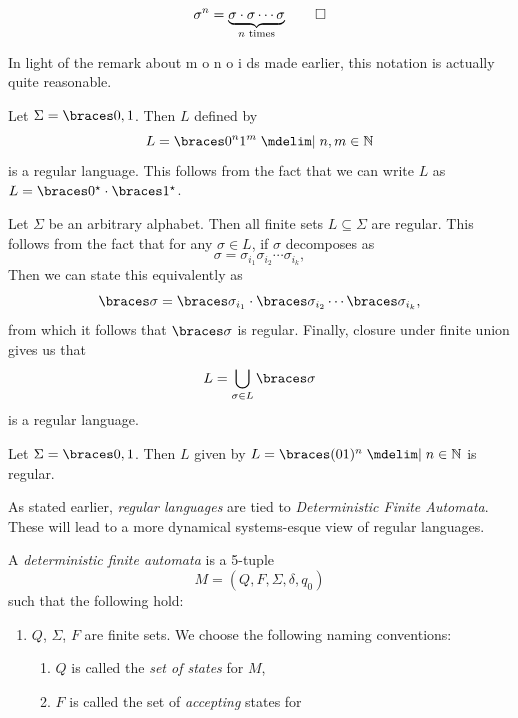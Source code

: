 \documentclass{fkpaper}
\begin{document}
\begin{multicols}{2}
\begin{definition}
\[      \sigma^n = \underbrace{\sigma \cdot \sigma \cdots \sigma}_{n\text{
          times}} \qedhere
    \]
  \end{definition}
  In light of the remark about {\color{red} m} {\color{orange} o}
  {\color{yellow} n} {\color{green} o} {\color{blue} i} {\color{purple}
    d}s made earlier, this notation is actually quite reasonable.
  \begin{example}\label{ex:dfa-example}
    Let $\Sigma = \set{0,1}$. Then $L$ defined by
    \[
      L = \set{0^n 1^m \MID n,m \in \NN}
    \]
    is a regular language. This follows from the fact that we can write
    $L$ as $L = \set{0}^\star \cdot \set{1}^\star$.
  \end{example}
  \begin{example}
    Let $\Sigma$ be an arbitrary alphabet. Then all finite sets $L
    \subseteq \Sigma$ are regular. This follows from the fact that for
    any $\sigma\in L$, if $\sigma$ decomposes as
    \[
      \sigma = \sigma_{i_1} \sigma_{i_2} \cdots \sigma_{i_k},
    \]
    Then we can state this equivalently as
    \[
      \set{\sigma} = \set{\sigma_{i_1}} \cdot \set{\sigma_{i_2}} \cdots
      \set{\sigma_{i_k}},
    \]
    from which it follows that $\set{\sigma}$ is regular. Finally,
    closure under finite union gives us that
    \[
      L = \bigcup_{\sigma \in L} \set{\sigma}
    \]
    is a regular language.
  \end{example}
  \begin{example}
    Let $\Sigma = \set{0,1}$. Then $L$ given by $L = \set{(01)^n \MID n
      \in \NN}$ is regular.
  \end{example}
  As stated earlier, \emph{regular languages} are tied to
  \emph{Deterministic Finite Automata}. These will lead to a more
  dynamical systems-esque view of regular languages.
  \begin{definition}\label{def:dfa}
    A \emph{deterministic finite automata} is a 5-tuple
    \[
      M = (Q, F, \Sigma, \delta, q_0)
    \]
    such that the following hold:
    \begin{enumerate}
      \item $Q$, $\Sigma$, $F$ are finite sets. We choose the following
        naming conventions:
        \begin{enumerate}[label=\roman*)]
          \item $Q$ is called the \emph{set of states} for $M$,
          \item $F$ is called the set of \emph{accepting} states for

\end{enumerate}
\end{enumerate}
\end{definition}
\end{multicols}
\end{document}
